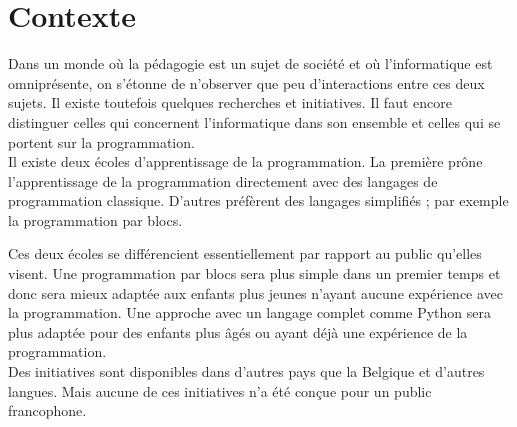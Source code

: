 \section{Contexte}
\label{intro-context}
Dans un monde où la pédagogie est un sujet de société et où l'informatique est omniprésente, on s'étonne de n'observer que peu d'interactions entre ces deux sujets. Il existe toutefois quelques recherches et initiatives. Il faut encore distinguer celles qui concernent l'informatique dans son ensemble et celles qui se portent sur la programmation.\\

Il existe deux écoles d'apprentissage de la programmation. La première prône l'apprentissage de la programmation directement avec des langages de programmation classique. D'autres préfèrent des langages simplifiés ; par exemple la programmation par \glspl{bloc}.

Ces deux écoles se différencient essentiellement par rapport au public qu'elles visent. Une programmation par \glspl{bloc} sera plus simple dans un premier temps et donc sera mieux adaptée aux enfants plus jeunes n'ayant aucune expérience avec la programmation. Une approche avec un langage complet comme Python sera plus adaptée pour des enfants plus âgés ou ayant déjà une expérience de la programmation.\\

Des initiatives sont disponibles dans d'autres pays que la Belgique et d'autres langues. Mais aucune de ces initiatives n'a été conçue pour un public francophone.




